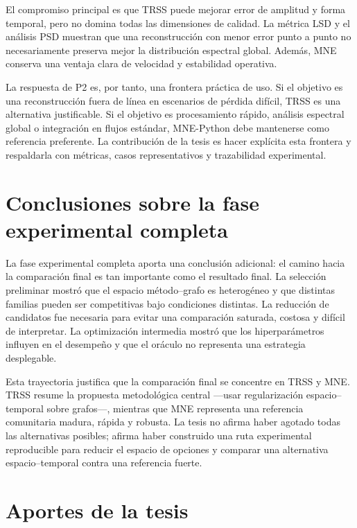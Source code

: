 El compromiso principal es que TRSS puede mejorar error de amplitud y forma temporal, pero no domina todas las dimensiones de calidad. La métrica LSD y el análisis PSD muestran que una reconstrucción con menor error punto a punto no necesariamente preserva mejor la distribución espectral global. Además, MNE conserva una ventaja clara de velocidad y estabilidad operativa.

La respuesta de P2 es, por tanto, una frontera práctica de uso. Si el objetivo es una reconstrucción fuera de línea en escenarios de pérdida difícil, TRSS es una alternativa justificable. Si el objetivo es procesamiento rápido, análisis espectral global o integración en flujos estándar, MNE-Python debe mantenerse como referencia preferente. La contribución de la tesis es hacer explícita esta frontera y respaldarla con métricas, casos representativos y trazabilidad experimental.

\section{Conclusiones sobre la fase experimental completa}

La fase experimental completa aporta una conclusión adicional: el camino hacia la comparación final es tan importante como el resultado final. La selección preliminar mostró que el espacio método--grafo es heterogéneo y que distintas familias pueden ser competitivas bajo condiciones distintas. La reducción de candidatos fue necesaria para evitar una comparación saturada, costosa y difícil de interpretar. La optimización intermedia mostró que los hiperparámetros influyen en el desempeño y que el oráculo no representa una estrategia desplegable.



Esta trayectoria justifica que la comparación final se concentre en TRSS y MNE. TRSS resume la propuesta metodológica central —usar regularización espacio--temporal sobre grafos—, mientras que MNE representa una referencia comunitaria madura, rápida y robusta. La tesis no afirma haber agotado todas las alternativas posibles; afirma haber construido una ruta experimental reproducible para reducir el espacio de opciones y comparar una alternativa espacio--temporal contra una referencia fuerte.

\section{Aportes de la tesis}

